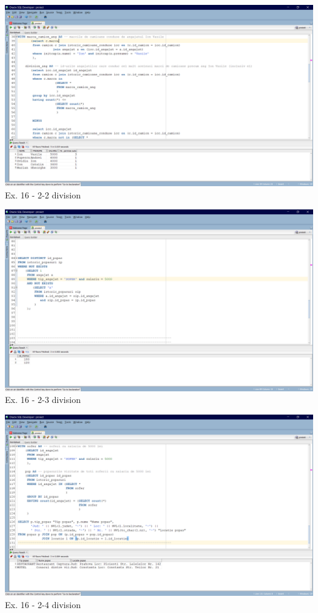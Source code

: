 \documentclass[12pt, a4paper]{article}
\begin{document}
\includegraphics[width=\textwidth]{division_2.PNG}
\label{Ex16 2-2}
\centering Ex. 16 - 2-2 division

\includegraphics[width=\textwidth]{division_3.PNG}
\label{Ex16 2-3}
\centering Ex. 16 - 2-3 division

\includegraphics[width=\textwidth]{division_4.PNG}
\label{Ex16 2-4}
\centering Ex. 16 - 2-4 division
\end{document}
